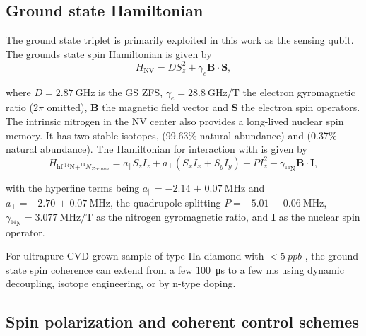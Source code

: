\subsection{Ground state Hamiltonian}

The ground state triplet is primarily exploited in this work as the sensing qubit. The grounds state spin Hamiltonian is given by
\begin{equation}
    H_{\mathrm{NV}} = D S_{z}^{2} + \gamma_{e} \mathbf{B} \cdot \mathbf{S},
\end{equation}

where $D = \qty{2.87}{\giga\hertz}$ is the \gls{GS} \gls{ZFS}, $\gamma_{e} = \qty{28.8}{\giga\hertz/\tesla}$ the electron gyromagnetic ratio ($2\pi$ omitted), $\mathbf{B}$ the magnetic field vector and $\mathbf{S}$ the electron spin operators. The intrinsic nitrogen in the \gls{NV} center also provides a long-lived nuclear spin memory\cite{neumannMultipartiteEntanglementSingle2008}. It has two stable isotopes,  (99.63\% natural abundance) and  (0.37\% natural abundance). The Hamiltonian for interaction with  is given by
\begin{equation}
    H_{\mathrm{hf\ ^{14}N}+^{14}N_{Zeeman}} = a_{\parallel} S_{z} I_{z} + a_{\perp} (S_{x} I_{x} + S_{y} I_{y}) + P I_{z}^{2} - \gamma_{\mathrm{^{14}N}} \mathbf{B} \cdot \mathbf{I},
\end{equation}

with the hyperfine terms being $a_{\parallel} = \qty{-2.14(7)}{\mega\hertz}$ and $a_{\perp} = \qty{-2.70(7)}{\mega\hertz}$, the quadrupole splitting $P = \qty{-5.01(6)}{\mega\hertz}$, $\gamma_{\mathrm{^{14}N}} = \qty{3.077}{\mega\hertz/\tesla}$ as the nitrogen gyromagnetic ratio, and $\mathbf{I}$ as the nuclear spin operator\cite{feltonHyperfineInteractionGround2009}.

For ultrapure \gls{CVD} grown sample of type IIa diamond with $<\qty{5}{ppb}$ , the ground state spin coherence can extend from a few \qty{100}{\micro\second} to a few \unit{\milli\second} using dynamic decoupling\cite{childressCoherentDynamicsCoupled2006}, isotope engineering\cite{balasubramanianUltralongSpinCoherence2009}, or by n-type doping\cite{herbschlebUltralongCoherenceTimes2019}.

\subsection{Spin polarization and coherent control schemes}

